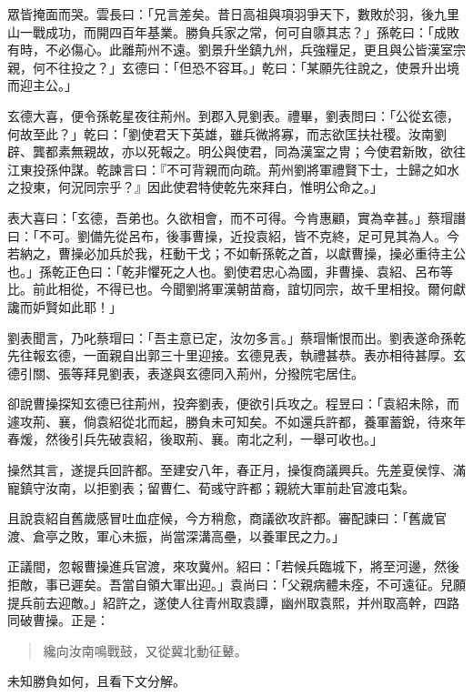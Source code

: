 眾皆掩面而哭。雲長曰：「兄言差矣。昔日高祖與項羽爭天下，數敗於羽，後九里山一戰成功，而開四百年基業。勝負兵家之常，何可自隳其志？」孫乾曰：「成敗有時，不必傷心。此離荊州不遠。劉景升坐鎮九州，兵強糧足，更且與公皆漢室宗親，何不往投之？」玄德曰：「但恐不容耳。」乾曰：「某願先往說之，使景升出境而迎主公。」

玄德大喜，便令孫乾星夜往荊州。到郡入見劉表。禮畢，劉表問曰：「公從玄德，何故至此？」乾曰：「劉使君天下英雄，雖兵微將寡，而志欲匡扶社稷。汝南劉辟、龔都素無親故，亦以死報之。明公與使君，同為漢室之冑；今使君新敗，欲往江東投孫仲謀。乾諫言曰：『不可背親而向疏。荊州劉將軍禮賢下士，士歸之如水之投東，何況同宗乎？』因此使君特使乾先來拜白，惟明公命之。」

表大喜曰：「玄德，吾弟也。久欲相會，而不可得。今肯惠顧，實為幸甚。」蔡瑁譖曰：「不可。劉備先從呂布，後事曹操，近投袁紹，皆不克終，足可見其為人。今若納之，曹操必加兵於我，枉動干戈；不如斬孫乾之首，以獻曹操，操必重待主公也。」孫乾正色曰：「乾非懼死之人也。劉使君忠心為國，非曹操、袁紹、呂布等比。前此相從，不得已也。今聞劉將軍漢朝苗裔，誼切同宗，故千里相投。爾何獻讒而妒賢如此耶！」

劉表聞言，乃叱蔡瑁曰：「吾主意已定，汝勿多言。」蔡瑁慚恨而出。劉表遂命孫乾先往報玄德，一面親自出郭三十里迎接。玄德見表，執禮甚恭。表亦相待甚厚。玄德引關、張等拜見劉表，表遂與玄德同入荊州，分撥院宅居住。

卻說曹操探知玄德已往荊州，投奔劉表，便欲引兵攻之。程昱曰：「袁紹未除，而遽攻荊、襄，倘袁紹從北而起，勝負未可知矣。不如還兵許都，養軍蓄銳，待來年春煖，然後引兵先破袁紹，後取荊、襄。南北之利，一舉可收也。」

操然其言，遂提兵回許都。至建安八年，春正月，操復商議興兵。先差夏侯惇、滿寵鎮守汝南，以拒劉表；留曹仁、荀彧守許都；親統大軍前赴官渡屯紮。

且說袁紹自舊歲感冒吐血症候，今方稍愈，商議欲攻許都。審配諫曰：「舊歲官渡、倉亭之敗，軍心未振，尚當深溝高壘，以養軍民之力。」

正議間，忽報曹操進兵官渡，來攻冀州。紹曰：「若候兵臨城下，將至河邊，然後拒敵，事已遲矣。吾當自領大軍出迎。」袁尚曰：「父親病體未痊，不可遠征。兒願提兵前去迎敵。」紹許之，遂使人往青州取袁譚，幽州取袁熙，并州取高幹，四路同破曹操。正是：

\begin{quote}
纔向汝南鳴戰鼓，又從冀北動征鼙。
\end{quote}

未知勝負如何，且看下文分解。
